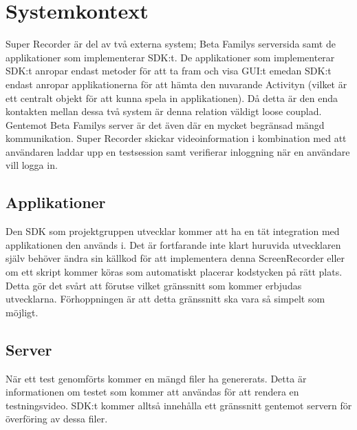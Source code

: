 \section{Systemkontext}
Super Recorder är del av två externa system; Beta Familys serversida samt de applikationer som implementerar SDK:t. De applikationer som implementerar SDK:t anropar endast metoder för att ta fram och visa GUI:t emedan SDK:t endast anropar applikationerna för att hämta den nuvarande Activityn (vilket är ett centralt objekt för att kunna spela in applikationen). Då detta är den enda kontakten mellan dessa två system är denna relation väldigt loose couplad. 
Gentemot Beta Familys server är det även där en mycket begränsad mängd kommunikation. Super Recorder skickar videoinformation i kombination med att användaren laddar upp en testsession samt verifierar inloggning när en användare vill logga in. 

\subsection{Applikationer}
Den SDK som projektgruppen utvecklar kommer att ha en tät integration med applikationen den används i. Det är fortfarande inte klart huruvida utvecklaren själv behöver ändra sin källkod för att implementera denna ScreenRecorder eller om ett skript kommer köras som automatiskt placerar kodstycken på rätt plats. Detta gör det svårt att förutse vilket gränssnitt som kommer erbjudas utvecklarna. Förhoppningen är att detta gränssnitt ska vara så simpelt som möjligt.

\subsection{Server}
När ett test genomförts kommer en mängd filer ha genererats. Detta är informationen om testet som kommer att användas för att rendera en testningsvideo. SDK:t kommer alltså innehålla ett gränssnitt gentemot servern för överföring av dessa filer. 
